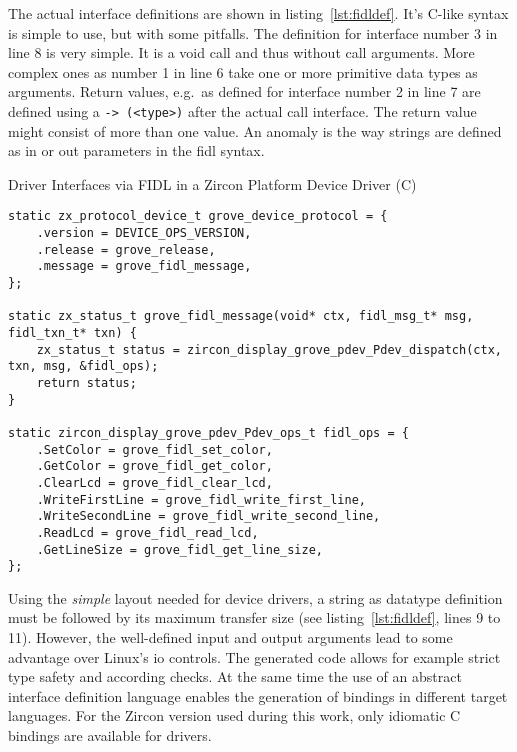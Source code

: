 The actual interface definitions are shown in listing~\ref{lst:fidldef}.
It's C-like syntax is simple to use, but with some pitfalls.
The definition for interface number 3 in line 8 is very simple.
It is a void call and thus without call arguments.
More complex ones as number 1 in line 6 take one or more primitive data types as arguments.
Return values, e.g.\ as defined for interface number 2 in line 7 are defined using a \texttt{-> (<type>)} after the actual call interface.
The return value might consist of more than one value.
An anomaly is the way strings are defined as in or out parameters in the \ac{fidl} syntax.
%
\begin{listing} [H]
    \caption{Driver Interfaces via FIDL in a Zircon Platform Device Driver (C)}
\label{lst:fidlinit}
\begin{verbatim}
static zx_protocol_device_t grove_device_protocol = {
    .version = DEVICE_OPS_VERSION,
    .release = grove_release,
    .message = grove_fidl_message,
};

static zx_status_t grove_fidl_message(void* ctx, fidl_msg_t* msg, fidl_txn_t* txn) {
    zx_status_t status = zircon_display_grove_pdev_Pdev_dispatch(ctx, txn, msg, &fidl_ops);
    return status;
}

static zircon_display_grove_pdev_Pdev_ops_t fidl_ops = {
    .SetColor = grove_fidl_set_color,
    .GetColor = grove_fidl_get_color,
    .ClearLcd = grove_fidl_clear_lcd,
    .WriteFirstLine = grove_fidl_write_first_line,
    .WriteSecondLine = grove_fidl_write_second_line,
    .ReadLcd = grove_fidl_read_lcd,
    .GetLineSize = grove_fidl_get_line_size,
};
\end{verbatim}
\end{listing}
%
Using the \textit{simple} layout needed for device drivers, a string as datatype definition must be followed by its maximum transfer size (see listing~\ref{lst:fidldef}, lines 9 to 11).
However, the well-defined input and output arguments lead to some advantage over Linux's \ac{io} controls.
The generated code allows for example strict type safety and according checks.
At the same time the use of an abstract interface definition language enables the generation of bindings in different target languages.
For the Zircon version used during this work, only idiomatic C bindings are available for drivers.

